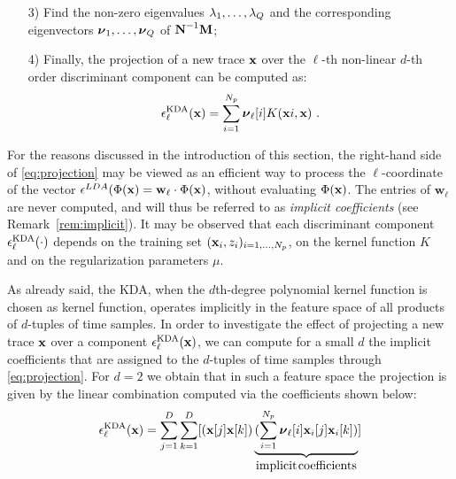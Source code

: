 \begin{procedure}
\begin{itemize}
\item[3)]\label{point:eigs} Find the non-zero eigenvalues $\lambda_1, \dots, \lambda_Q$ and the corresponding eigenvectors $\boldsymbol{\nu}_1, \dots, \boldsymbol{\nu}_Q$ of $\textbf{N}^{-1}\textbf{M}$; 


\item[4)] Finally, the projection of a new trace $\textbf{x}$ over the $\ell$-th non-linear $d$-th order discriminant component can be computed as:
\begin{equation}\label{eq:projection}
\epsilon^{\mathrm{KDA}}_{\ell}(\textbf{x}) = \sum_{i=1}^{N_p}\boldsymbol{\nu}_\ell[i]K(\textbf{x}{i}, \textbf{x}) \mbox{ .}
\end{equation} 

\end{itemize}
\end{procedure}
For the reasons discussed in the introduction of this section, the right-hand side of \eqref{eq:projection} may be viewed as an efficient way to process the $\ell$-coordinate of the vector $\epsilon^{LDA}(\Phi(\textbf{x}) = \textbf{w}_{\ell} \cdot \Phi(\textbf{x})$,
without evaluating $\Phi(\textbf{x})$. The entries of $\textbf{w}_{\ell}$ are never computed, and will thus be referred to as \emph{implicit coefficients} (see Remark~\ref{rem:implicit}). It may be observed that each discriminant component $\epsilon^{\mathrm{KDA}}_{\ell}(\cdot)$ depends on the training set $(\textbf{x}_i, z_i)_{i=1, \dots , N_p}$, on the kernel function $K$ and on the regularization parameters $\mu$.

\begin{remark}\label{rem:implicit}
As already said, the KDA, when the $d$th-degree  polynomial kernel function is chosen as kernel function, operates implicitly in the feature space of all products of $d$-tuples of time samples. In order to investigate the effect of projecting a new trace $\textbf{x}$ over a component $\epsilon^{\mathrm{KDA}}_{\ell}(\textbf{x})$, we can compute for a small $d$ the implicit coefficients that are assigned to the $d$-tuples of time samples through \eqref{eq:projection}. For $d=2$ we obtain that in such a feature space the projection is given by the linear combination computed via the coefficients shown below: 
\begin{equation}\label{eq:implicit}
\epsilon^{\mathrm{KDA}}_{\ell}(\textbf{x}) = \sum_{j=1}^D \sum_{k=1}^D[ (\textbf{x}[j]\textbf{x}[k])\underbrace{(\sum_{i=1}^{N_p}\boldsymbol{\nu}_{\ell}[i] \textbf{x}_i[j]\textbf{x}_{i}[k])}_{\mbox{implicit \\ coefficients}}]
\end{equation}

\end{remark}


